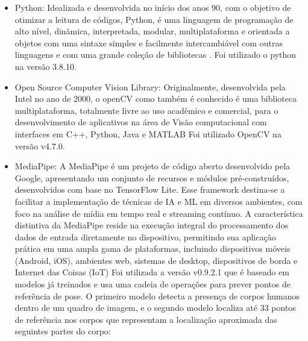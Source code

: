 \begin{itemize}




   \item Python: Idealizada e desenvolvida no início dos anos 90,  com o objetivo de otimizar a leitura de códigos, Python, é uma linguagem de programação de alto nível, dinâmica, interpretada, modular, multiplataforma e orientada a objetos com uma sintaxe simples e facilmente intercambiável com outras linguagens e com uma grande coleção de bibliotecas \cite{python}. Foi utilizado o python na versão 3.8.10.

   \item Open Source Computer Vision Library: Originalmente, desenvolvida pela Intel no ano de 2000, o openCV como também é conhecido é  uma biblioteca multiplataforma, totalmente livre ao uso acadêmico e comercial, para o desenvolvimento de aplicativos na área de Visão computacional com interfaces em C++, Python, Java e MATLAB \cite{openCV} Foi utilizado OpenCV na versão v4.7.0.
   
   \item MediaPipe: A MediaPipe é um projeto de código aberto desenvolvido pela Google, apresentando um conjunto de recursos e módulos pré-construídos, desenvolvidos com base no TensorFlow Lite. Esse framework destina-se a facilitar a implementação de técnicas de \ac{IA} e \ac{ML} em diversos ambientes, com foco na análise de mídia em tempo real e streaming contínuo. A característica distintiva da MediaPipe reside na execução integral do processamento dos dados de entrada diretamente no dispositivo, permitindo sua aplicação prática em uma ampla gama de plataformas, incluindo dispositivos móveis (Android, iOS), ambientes web, sistemas de desktop, dispositivos de borda e Internet das Coisas (IoT)\cite{mediapipe} Foi utilizada a versão v0.9.2.1 que é baseado em modelos já treinados e usa uma cadeia de operações para prever pontos de referência de pose. O primeiro modelo detecta a presença de corpos humanos dentro de um quadro de imagem, e o segundo modelo localiza até 33 pontos de referência nos corpos \cite{mediapipe_pose_landmarker} que representam a localização aproximada das seguintes partes do corpo:



\end{itemize}
